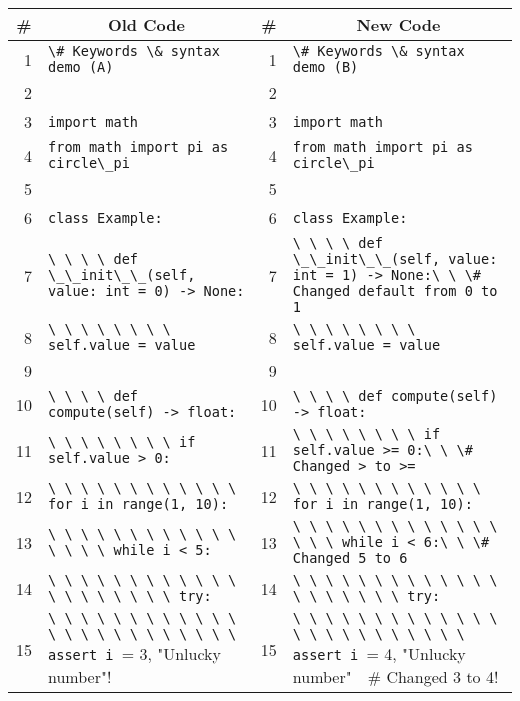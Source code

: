 \documentclass{article}
\newcommand{\code}[1]{\lstinline[style=diffcode]!#1!}
\begin{document}
\begin{tabularx}{\linewidth}{r X r X}
\multicolumn{1}{c}{\textbf{\#}} & \multicolumn{1}{c}{\textbf{Old Code}} &
\multicolumn{1}{c}{\textbf{\#}} & \multicolumn{1}{c}{\textbf{New Code}} \\
\hline
\cellcolor{remred}1 & \cellcolor{remred}\code{\# Keywords \& syntax demo (A)} & \cellcolor{addgreen}1 & \cellcolor{addgreen}\code{\# Keywords \& syntax demo (B)} \\
2 & \code{} & 2 & \code{} \\
3 & \code{import math} & 3 & \code{import math} \\
4 & \code{from math import pi as circle\_pi} & 4 & \code{from math import pi as circle\_pi} \\
5 & \code{} & 5 & \code{} \\
6 & \code{class Example:} & 6 & \code{class Example:} \\
\cellcolor{remred}7 & \cellcolor{remred}\code{\ \ \ \ def \_\_init\_\_(self, value: int = 0) -> None:} & \cellcolor{addgreen}7 & \cellcolor{addgreen}\code{\ \ \ \ def \_\_init\_\_(self, value: int = 1) -> None:\ \ \# Changed default from 0 to 1} \\
8 & \code{\ \ \ \ \ \ \ \ self.value = value} & 8 & \code{\ \ \ \ \ \ \ \ self.value = value} \\
9 & \code{} & 9 & \code{} \\
10 & \code{\ \ \ \ def compute(self) -> float:} & 10 & \code{\ \ \ \ def compute(self) -> float:} \\
\cellcolor{remred}11 & \cellcolor{remred}\code{\ \ \ \ \ \ \ \ if self.value > 0:} & \cellcolor{addgreen}11 & \cellcolor{addgreen}\code{\ \ \ \ \ \ \ \ if self.value >= 0:\ \ \# Changed > to >=} \\
12 & \code{\ \ \ \ \ \ \ \ \ \ \ \ for i in range(1, 10):} & 12 & \code{\ \ \ \ \ \ \ \ \ \ \ \ for i in range(1, 10):} \\
\cellcolor{remred}13 & \cellcolor{remred}\code{\ \ \ \ \ \ \ \ \ \ \ \ \ \ \ \ while i < 5:} & \cellcolor{addgreen}13 & \cellcolor{addgreen}\code{\ \ \ \ \ \ \ \ \ \ \ \ \ \ \ \ while i < 6:\ \ \# Changed 5 to 6} \\
14 & \code{\ \ \ \ \ \ \ \ \ \ \ \ \ \ \ \ \ \ \ \ try:} & 14 & \code{\ \ \ \ \ \ \ \ \ \ \ \ \ \ \ \ \ \ \ \ try:} \\
\cellcolor{remred}15 & \cellcolor{remred}\code{\ \ \ \ \ \ \ \ \ \ \ \ \ \ \ \ \ \ \ \ \ \ \ \ assert i != 3, "Unlucky number"} & \cellcolor{addgreen}15 & \cellcolor{addgreen}\code{\ \ \ \ \ \ \ \ \ \ \ \ \ \ \ \ \ \ \ \ \ \ \ \ assert i != 4, "Unlucky number"\ \ \# Changed 3 to 4} \\

\end{tabularx}
\end{document}

